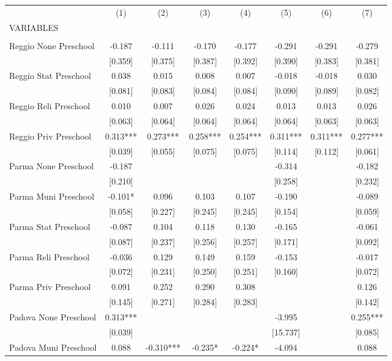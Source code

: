 \begin{tabular}{lccccccc} \hline
 & (1) & (2) & (3) & (4) & (5) & (6) & (7) \\
VARIABLES &  &  &  &  &  &  &  \\ \hline
 &  &  &  &  &  &  &  \\
Reggio None Preschool & -0.187 & -0.111 & -0.170 & -0.177 & -0.291 & -0.291 & -0.279 \\
 & [0.359] & [0.375] & [0.387] & [0.392] & [0.390] & [0.383] & [0.381] \\
Reggio Stat Preschool & 0.038 & 0.015 & 0.008 & 0.007 & -0.018 & -0.018 & 0.030 \\
 & [0.081] & [0.083] & [0.084] & [0.084] & [0.090] & [0.089] & [0.082] \\
Reggio Reli Preschool & 0.010 & 0.007 & 0.026 & 0.024 & 0.013 & 0.013 & 0.026 \\
 & [0.063] & [0.064] & [0.064] & [0.064] & [0.064] & [0.063] & [0.063] \\
Reggio Priv Preschool & 0.313*** & 0.273*** & 0.258*** & 0.254*** & 0.311*** & 0.311*** & 0.277*** \\
 & [0.039] & [0.055] & [0.075] & [0.075] & [0.114] & [0.112] & [0.061] \\
Parma None Preschool & -0.187 &  &  &  & -0.314 &  & -0.182 \\
 & [0.210] &  &  &  & [0.258] &  & [0.232] \\
Parma Muni Preschool & -0.101* & 0.096 & 0.103 & 0.107 & -0.190 &  & -0.089 \\
 & [0.058] & [0.227] & [0.245] & [0.245] & [0.154] &  & [0.059] \\
Parma Stat Preschool & -0.087 & 0.104 & 0.118 & 0.130 & -0.165 &  & -0.061 \\
 & [0.087] & [0.237] & [0.256] & [0.257] & [0.171] &  & [0.092] \\
Parma Reli Preschool & -0.036 & 0.129 & 0.149 & 0.159 & -0.153 &  & -0.017 \\
 & [0.072] & [0.231] & [0.250] & [0.251] & [0.160] &  & [0.072] \\
Parma Priv Preschool & 0.091 & 0.252 & 0.290 & 0.308 &  &  & 0.126 \\
 & [0.145] & [0.271] & [0.284] & [0.283] &  &  & [0.142] \\
Padova None Preschool & 0.313*** &  &  &  & -3.995 &  & 0.255*** \\
 & [0.039] &  &  &  & [15.737] &  & [0.085] \\
Padova Muni Preschool & 0.088 & -0.310*** & -0.235* & -0.224* & -4.094 &  & 0.088 \\

\end{tabular}

